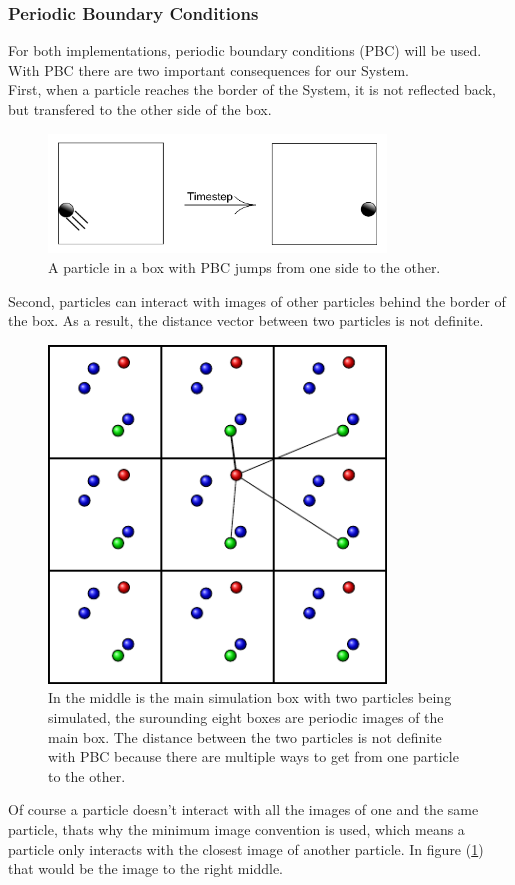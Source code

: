 \subsubsection*{Periodic Boundary Conditions}
For both implementations, periodic boundary conditions (PBC) will be used.
With PBC there are two important consequences for our System. \\
First, when a particle reaches the border of the System, it is not reflected back, but transfered to the other side of the box.
\begin{figure}[h!]
\centering
\includegraphics[width=0.8\textwidth]{Figures/PBCjump.pdf}
\caption[PBC: Jump Case]{A particle in a box with PBC jumps from one side to the other.}
\end{figure}
Second, particles can interact with images of other particles behind the border of the box. As a result, the distance vector between two particles is not definite. 
\begin{figure}[h!]
\centering
\includegraphics[width=0.8\textwidth]{Figures/tikz/MinimalDistance.pdf}
\caption[PBC: Interaction Case]{In the middle is the main simulation box with two particles being simulated, the surounding eight boxes are periodic images of the main box. The distance between the two particles is not definite with PBC because there are multiple ways to get from one particle to the other.}
\label{PBCinteraction}
\end{figure}
Of course a particle doesn't interact with all the images of one and the same particle, thats why the minimum image convention is used, which means a particle only interacts with the closest image of another particle. In figure (\ref{PBCinteraction}) that would be the image to the right middle.





